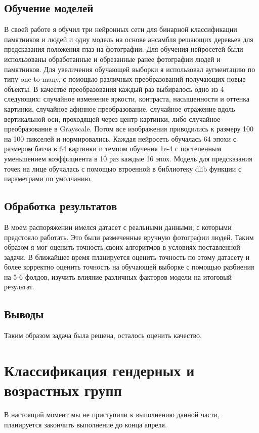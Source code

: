 \documentclass[a4paper,14pt]{extarticle}
\begin{document}
    \subsection{Обучение моделей}
    В своей работе я обучил три нейронных сети для бинарной классификации памятников и людей и одну модель на основе ансамбля решающих деревьев для предсказания положения глаз на фотографии.
    Для обучения нейросетей были использованы обработанные и обрезанные ранее фотографии людей и памятников. Для увеличения обучающей выборки я использовал аугментацию по типу one-to-many, с помощью различных преобразований получающих новые объекты. В качестве преобразования каждый раз выбиралось одно из 4 следующих: случайное изменение яркости, контраста, насыщенности и оттенка картинки, случайное афинное преобразование, случайное отражение вдоль вертикальной оси, проходящей через центр картинки, либо случайное преобразование в Grayscale. Потом все изображения приводились к размеру 100 на 100 пикселей и нормировались.
    Каждая нейросеть обучалась 64 эпохи с размером батча в 64 картинки и темпом обучения 1e-4 с постепенным уменьшением коэффициента в 10 раз каждые 16 эпох.
    Модель для предсказания точек на лице обучалась с помощью втроенной в библиотеку dlib функции с параметрами по умолчанию.

    \subsection{Обработка результатов}
    В моем распоряжении имелся датасет с реальными данными, с которыми предстояло работать. Это были размеченные вручную фотографии людей. Таким образом я мог оценить точность своих алгоритмов в условиях поставленной задачи. В ближайшее время планируется оценить точность по этому датасету и более корректно оценить точность на обучающей выборке с помощью разбиения на 5-6 фолдов, изучить влияние различных факторов модели на итоговый результат.

    \subsection{Выводы}
    Таким образом задача была решена, осталось оценить качество.
    \newpage

    \section{Классификация гендерных и возрастных групп}
    В настоящий момент мы не приступили к выполнению данной части, планируется закончить выполнение до конца апреля.
    \newpage
\end{document}
